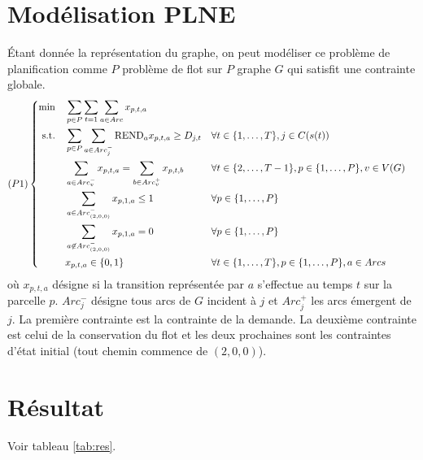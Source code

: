 \documentclass[a4paper]{article}
\begin{document}
\section{Modélisation PLNE}
Étant donnée la représentation du graphe, on peut modéliser ce problème de planification comme $P$ problème de flot sur $P$ graphe $G$ qui satisfit une contrainte globale. 
\begin{equation*}
    (P1) \left\{ 
    \begin{aligned}
    \min\quad        & \sum_{p\in P}\sum_{t=1}\sum_{a\in Arc} x_{p,t,a}   \\
    \text{s.t.\quad} & \sum_{p\in P}\sum_{a\in Arc^{-}_{j}} \text{REND}_a x_{p,t,a} \geq D_{j,t} & & \forall t\in \{1, \ldots, T\}, j \in C(s(t)) \\
                     & \sum_{a\in Arc^{-}_{v}} x_{p,t,a} = \sum_{b\in Arc^{+}_{v}} x_{p,t,b} & & \forall t \in \{2, \ldots, T-1\}, p \in \{1, \ldots, P\}, v\in V(G)\\
                     & \sum_{a\in Arc^{-}_{(2,0,0)}} x_{p,1,a} \leq 1 & &  \forall p \in \{1, \ldots, P\} \\
                     & \sum_{a\not\in Arc^{-}_{(2,0,0)}} x_{p,1,a} = 0 & &  \forall p \in \{1, \ldots, P\} \\
                     & x_{p,t,a} \in \{0,1\} & & \forall t \in \{1, \ldots, T\}, p \in \{1, \ldots, P\}, a \in Arcs
  \end{aligned}
\right.
\end{equation*}
où $x_{p,t,a}$ désigne si la transition représentée par $a$ s'effectue au temps $t$ sur la parcelle $p$. $Arc^{-}_{j}$ désigne tous arcs de $G$ incident à $j$ et $Arc^{+}_{j}$ les arcs émergent de $j$. La première contrainte est la contrainte de la demande. La deuxième contrainte est celui de la conservation du flot et les deux prochaines sont les contraintes d'état initial (tout chemin commence de $(2,0,0)$).

\section{Résultat}
Voir tableau \ref{tab:res}.
\begin{table}
    \centering
    \caption{Information de la solution trouvée}
    \label{tab:res}
\end{table}
\end{document}
